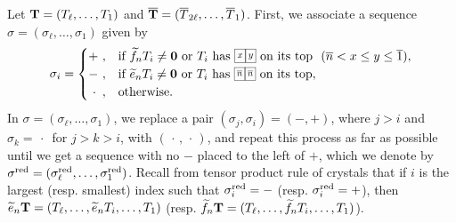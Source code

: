 \documentclass[leqno,11pt]{amsart}
\numberwithin{equation}{section}
\newcommand{\ov}{\overline}
\newcommand{\te}{\widetilde{e}}
\newcommand{\tf}{\widetilde{f}}
\begin{document}
Let ${\bf T}=(T_\ell,\ldots,T_1)$ and $\ov{\bf T}=(\ov T_{2\ell},\ldots,\ov T_1)$. First, we associate a sequence $\sigma=(\sigma_\ell,\ldots,\sigma_1)$ given by
\begin{equation}
\sigma_i=
\begin{cases}
+\ ,& \text{if $\tf_n T_i\neq {\bf 0}$ or  $T_i$ has 
$\resizebox{.05\hsize}{!}{\def\lr#1{\multicolumn{1}{|@{\hspace{.6ex}}c@{\hspace{.6ex}}|}{\raisebox{.2ex}{$#1$}}}\raisebox{-.65ex}
{$\begin{array}[b]{cc}
\cline{1-1}\cline{2-2}
\lr{{x}}&\lr{{y}}\\
\cline{1-1}\cline{2-2}
\end{array}$}}$ 
on its top \ $(\ov n < x \leq  y\leq \ov 1)$},\\
-\ ,& 
\text{if $\te_n T_i\neq {\bf 0}$ or $T_i$ has 
$\resizebox{.05\hsize}{!}{\def\lr#1{\multicolumn{1}{|@{\hspace{.6ex}}c@{\hspace{.6ex}}|}{\raisebox{.1ex}{$#1$}}}\raisebox{-.65ex}
{$\begin{array}[b]{cc}
\cline{1-1}\cline{2-2}
\lr{\ov{n}}&\lr{\ov{n}}\\
\cline{1-1}\cline{2-2}
\end{array}$}}$ 
on its top},\\
\ \cdot\ \, ,& \text{otherwise}.
\end{cases}
\end{equation}
In $\sigma=(\sigma_\ell,\ldots,\sigma_1)$, we replace a
pair $(\sigma_{j},\sigma_{i})=(-,+)$, where $j>i$ and
$\sigma_k=\,\cdot\,$ for $j>k>i$, with $(\,\cdot\,,\,\cdot\,)$, and repeat
this process as far as possible until we get a sequence with no $-$
placed to the left of $+$, which we denote by 
$\sigma^{\rm red}=(\sigma^{\rm red}_\ell,\ldots,\sigma^{\rm red}_1)$.
Recall from tensor product rule of crystals that if $i$ is the largest (resp. smallest) index such that $\sigma^{\rm red}_i=-$ (resp. $\sigma^{\rm red}_i=+$), then $\te_n {\bf T}=(T_\ell,\ldots,\te_nT_i,\ldots,T_1)$ (resp. $\tf_n {\bf T}=(T_\ell,\ldots,\tf_nT_i,\ldots,T_1)$).
\end{document}
